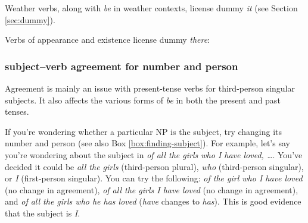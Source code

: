 \ea
    \z
\z
    
Weather verbs, along with {\textit{be}} in weather contexts, license dummy \textit{it} (see Section \ref{sec:dummy}). 

\ea
    \z
\z

Verbs of appearance and existence license dummy \textit{there}: 

\ea
    \z
\z{}

\subsubsection*{subject--verb agreement for number and person}
Agreement is mainly an issue with present-tense verbs for third-person singular subjects. It also affects the various forms of \textit{be} in both the present and past tenses. 

\ea
    \z
\z

If you're wondering whether a particular NP is the subject, try changing its number and person (see also Box \ref{box:finding-subject}). For example, let's say you're wondering about the subject in \textit{of all the girls who I have loved, \dots}. You've decided it could be \textit{all the girls} (third-person plural), \textit{who} (third-person singular), or \textit{I} (first-person singular). You can try the following: \textit{of the girl who I have loved} (no change in agreement), \textit{of all the girls I have loved} (no change in agreement), and \textit{of all the girls who he has loved} (\textit{have} changes to \textit{has}). This is good evidence that the subject is \textit{I}.

